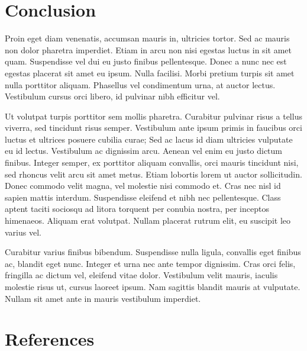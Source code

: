 \documentclass{article}
\begin{document}
\section{Conclusion}

Proin eget diam venenatis, accumsan mauris in, ultricies tortor. Sed ac mauris non dolor pharetra imperdiet. Etiam in arcu non nisi egestas luctus in sit amet quam. Suspendisse vel dui eu justo finibus pellentesque. Donec a nunc nec est egestas placerat sit amet eu ipsum. Nulla facilisi. Morbi pretium turpis sit amet nulla porttitor aliquam. Phasellus vel condimentum urna, at auctor lectus. Vestibulum cursus orci libero, id pulvinar nibh efficitur vel.

Ut volutpat turpis porttitor sem mollis pharetra. Curabitur pulvinar risus a tellus viverra, sed tincidunt risus semper. Vestibulum ante ipsum primis in faucibus orci luctus et ultrices posuere cubilia curae; Sed ac lacus id diam ultricies vulputate eu id lectus. Vestibulum ac dignissim arcu. Aenean vel enim eu justo dictum finibus. Integer semper, ex porttitor aliquam convallis, orci mauris tincidunt nisi, sed rhoncus velit arcu sit amet metus. Etiam lobortis lorem ut auctor sollicitudin. Donec commodo velit magna, vel molestie nisi commodo et. Cras nec nisl id sapien mattis interdum. Suspendisse eleifend et nibh nec pellentesque. Class aptent taciti sociosqu ad litora torquent per conubia nostra, per inceptos himenaeos. Aliquam erat volutpat. Nullam placerat rutrum elit, eu suscipit leo varius vel.

Curabitur varius finibus bibendum. Suspendisse nulla ligula, convallis eget finibus ac, blandit eget nunc. Integer et urna nec ante tempor dignissim. Cras orci felis, fringilla ac dictum vel, eleifend vitae dolor. Vestibulum velit mauris, iaculis molestie risus ut, cursus laoreet ipsum. Nam sagittis blandit mauris at vulputate. Nullam sit amet ante in mauris vestibulum imperdiet. 

\section{References}


\end{document}
